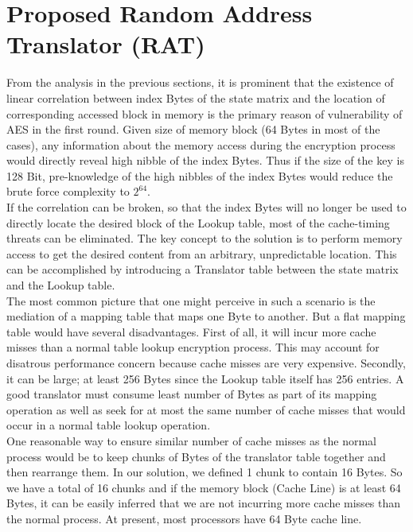 \section{Proposed Random Address Translator (RAT)}

From the analysis in the previous sections, it is prominent that the existence of linear correlation between index Bytes of the state matrix and the location of corresponding accessed block in memory is the primary reason of vulnerability of AES in the first round. Given size of memory block (64 Bytes in most of the cases), any information about the memory access during the encryption process would directly reveal high nibble of the index Bytes. Thus if the size of the key is 128 Bit, pre-knowledge of the high nibbles of the index Bytes would reduce the brute force complexity to $2^{64}$.\\

If the correlation can be broken, so that the index Bytes will no longer be used to directly locate the desired block of the Lookup table, most of the cache-timing threats can be eliminated. The key concept to the solution is to perform memory access to get the desired content from an arbitrary, unpredictable location. This can be accomplished by introducing a Translator table between the state matrix and the Lookup table.\\

The most common picture that one might perceive in such a scenario is the mediation of a mapping table that maps one Byte to another. But a flat mapping table would have several disadvantages. First of all, it will incur more cache misses than a normal table lookup encryption process. This may account for disatrous performance concern because cache misses are very expensive. Secondly, it can be large; at least 256 Bytes since the Lookup table itself has 256 entries. A good translator must consume least number of Bytes as part of its mapping operation as well as seek for at most the same number of cache misses that would occur in a normal table lookup operation.\\

One reasonable way to ensure similar number of cache misses as the normal process would be to keep chunks of Bytes of the translator table together and then rearrange them. In our solution, we defined 1 chunk to contain 16 Bytes. So we have a total of 16 chunks and if the memory block (Cache Line) is at least 64 Bytes, it can be easily inferred that we are not incurring more cache misses than the normal process. At present, most processors have 64 Byte cache line.\\

